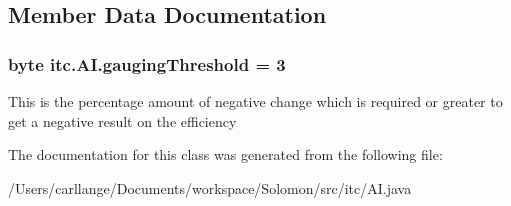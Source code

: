 \subsection{Member Data Documentation}
\hypertarget{classitc_1_1_a_i_a55e666c1cfd457046c1b2ddfc2b44d62}{
\subsubsection[{gaugingThreshold}]{\setlength{\rightskip}{0pt plus 5cm}byte {\bf itc.AI.gaugingThreshold} = 3}}
\label{classitc_1_1_a_i_a55e666c1cfd457046c1b2ddfc2b44d62}
This is the percentage amount of negative change which is required or greater to get a negative result on the efficiency 

The documentation for this class was generated from the following file:\begin{DoxyCompactItemize}
\item 
/Users/carllange/Documents/workspace/Solomon/src/itc/AI.java\end{DoxyCompactItemize}
